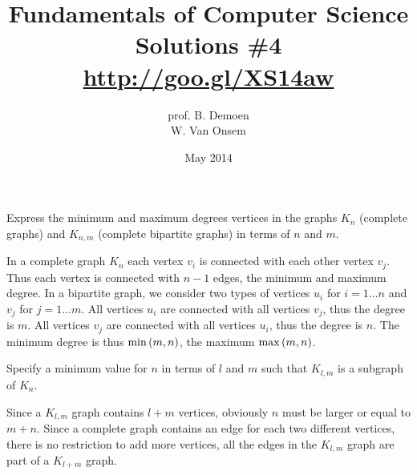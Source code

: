 \documentclass{article}
\title{Fundamentals of Computer Science\\Solutions \#4\\\url{http://goo.gl/XS14aw}}
\author{prof. B. Demoen\\W. Van Onsem}
\date{May 2014}
\begin{document}
\maketitle
\begin{exercise}
Express the minimum and maximum degrees vertices in the graphs $K_n$ (complete graphs) and $K_{n,m}$ (complete bipartite graphs) in terms of $n$ and $m$.
\begin{answer}
In a complete graph $K_n$ each vertex $v_i$ is connected with each other vertex $v_j$. Thus each vertex is connected with $n-1$ edges, the minimum and maximum degree. In a bipartite graph, we consider two types of vertices $u_i$ for $i=1\ldots n$ and $v_j$ for $j=1\ldots m$. All vertices $u_i$ are connected with all vertices $v_j$, thus the degree is $m$. All vertices $v_j$ are connected with all vertices $u_i$, thus the degree is $n$. The minimum degree is thus $\min\left( m,n \right)$, the maximum $\max\left( m,n \right)$.
\end{answer}
\end{exercise}

\begin{exercise}
Specify a minimum value for $n$ in terms of $l$ and $m$ such that $K_{l,m}$ is a subgraph of $K_n$.
\begin{answer}
Since a $K_{l,m}$ graph contains $l+m$ vertices, obviously $n$ must be larger or equal to $m+n$. Since a complete graph contains an edge for each two different vertices, there is no restriction to add more vertices, all the edges in the $K_{l,m}$ graph are part of a $K_{l+m}$ graph.
\end{answer}
\end{exercise}
\end{document}
